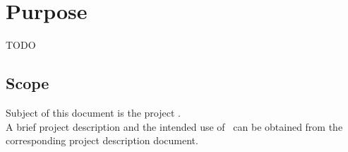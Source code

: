 \section{Purpose}
TODO

\subsection{Scope}
Subject of this document is the project \textit{\ThisProjectName}. \\
A brief project description and the intended use of \ThisProjectName~can be obtained from the corresponding project description document.